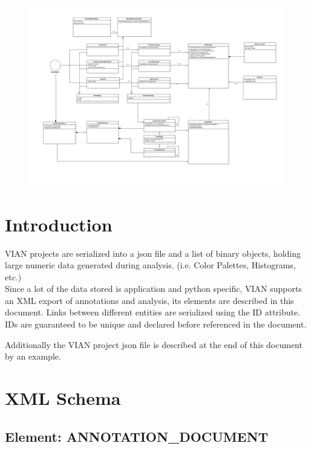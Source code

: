 \documentclass[11pt, a4paper,oneside,chapterprefix=false]{scrbook}
\begin{document}
\begin{landscape}
	\begin{figure}[htp]
		\centering
		\includegraphics[width = 1.5\textwidth]{figures/VIAN_DataModel_simplified.pdf}
		\label{fig:vian_classobj}
	\end{figure}
\end{landscape}

\section{Introduction}
VIAN projects are serialized into a json file and a list of binary objects, holding large numeric data generated during analysis. (i.e. Color Palettes, Histograms, etc.)\\

Since a lot of the data stored is application and python specific, VIAN supports an XML export of annotations and analysis, its elements are described in this document. Links between different entities are serialized using the ID attribute. IDs are guaranteed to be unique and declared before referenced in the document.

Additionally the VIAN project json file is described at the end of this document by an example.

\section{XML Schema}
\subsection{Element: ANNOTATION\_DOCUMENT}

\end{document}
